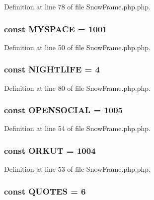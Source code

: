 Definition at line 78 of file SnowFrame.php.php.

\hypertarget{classSnowFrame_ae4601c5f1be26cd79d25df82df02e8c2}{
\subsubsection[{MYSPACE}]{\setlength{\rightskip}{0pt plus 5cm}const {\bf MYSPACE} = 1001}}
\label{classSnowFrame_ae4601c5f1be26cd79d25df82df02e8c2}


Definition at line 50 of file SnowFrame.php.php.

\hypertarget{classSnowFrame_a407090c71b40f525e5cc7fbb6745278b}{
\subsubsection[{NIGHTLIFE}]{\setlength{\rightskip}{0pt plus 5cm}const {\bf NIGHTLIFE} = 4}}
\label{classSnowFrame_a407090c71b40f525e5cc7fbb6745278b}


Definition at line 80 of file SnowFrame.php.php.

\hypertarget{classSnowFrame_aa5486bf01847fc1852eedc71d91c6bc4}{
\subsubsection[{OPENSOCIAL}]{\setlength{\rightskip}{0pt plus 5cm}const {\bf OPENSOCIAL} = 1005}}
\label{classSnowFrame_aa5486bf01847fc1852eedc71d91c6bc4}


Definition at line 54 of file SnowFrame.php.php.

\hypertarget{classSnowFrame_a2ac6d804f47c522b54bbbc9f87b592f6}{
\subsubsection[{ORKUT}]{\setlength{\rightskip}{0pt plus 5cm}const {\bf ORKUT} = 1004}}
\label{classSnowFrame_a2ac6d804f47c522b54bbbc9f87b592f6}


Definition at line 53 of file SnowFrame.php.php.

\hypertarget{classSnowFrame_ac7f8047fe65a35c174373c065d92e404}{
\subsubsection[{QUOTES}]{\setlength{\rightskip}{0pt plus 5cm}const {\bf QUOTES} = 6}}
\label{classSnowFrame_ac7f8047fe65a35c174373c065d92e404}



